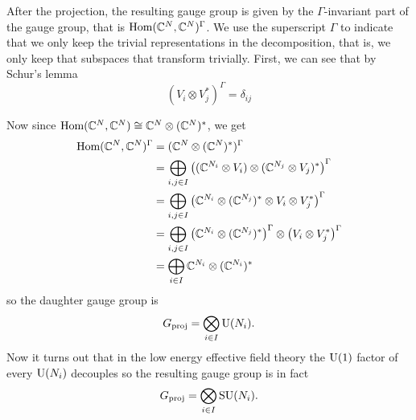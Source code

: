         After the projection, the resulting gauge group is given by the $\Gamma$-invariant part of the gauge group, that is $\text{Hom}(\mathbb{C}^N,\mathbb{C}^N)^\Gamma$. We use the superscript $\Gamma$ to indicate that we only keep the trivial representations in the decomposition, that is, we only keep that subspaces that transform trivially. First, we can see that by Schur's lemma \marker
        \begin{equation}
            (V_i\otimes V^*_j)^\Gamma=\delta_{ij}
        \end{equation}
        
        Now since $\text{Hom}(\mathbb{C}^N,\mathbb{C}^N)\cong\mathbb{C}^N\otimes(\mathbb{C}^N)^*$, we get
        \begin{align}
            \text{Hom}(\mathbb{C}^N,\mathbb{C}^N)^\Gamma &= (\mathbb{C}^N\otimes(\mathbb{C}^N)^*)^\Gamma\\
            &= \bigoplus_{i,j\in I} \left((\mathbb{C}^{N_i}\otimes V_i)\otimes(\mathbb{C}^{N_j}\otimes V_j)^*\right)^\Gamma\\
            &= \bigoplus_{i,j\in I} \left(\mathbb{C}^{N_i}\otimes(\mathbb{C}^{N_j})^*\otimes V_i\otimes V^*_j\right)^\Gamma\\
            &= \bigoplus_{i,j\in I} \left(\mathbb{C}^{N_i}\otimes(\mathbb{C}^{N_j})^*\right)^\Gamma\otimes\left(V_i\otimes V^*_j\right)^\Gamma\\
            &= \bigoplus_{i\in I}\mathbb{C}^{N_i}\otimes(\mathbb{C}^{N_i})^*
        \end{align}
        so the daughter gauge group is
        \begin{equation}
            G_{\text{proj}} = \bigotimes_{i\in I}\text{U}(N_i).
        \end{equation}
        Now it turns out that in the low energy effective field theory the $\text{U}(1)$ factor of every $\text{U}(N_i)$ decouples \marker so the resulting gauge group is in fact
        \begin{equation}
            G_{\text{proj}} = \bigotimes_{i\in I}\text{SU}(N_i).
        \end{equation}

